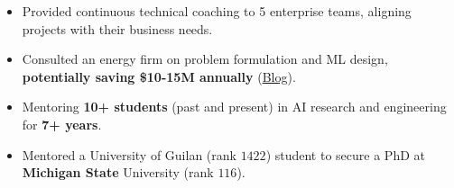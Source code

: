 {
}

    
\begin{itemize}
    \item Provided continuous technical coaching to 5 enterprise teams, aligning projects with their business needs.
    \item Consulted an energy firm on problem formulation and ML design, \textbf{potentially saving \$10-15M annually} (\href{https://www.amii.ca/latest-from-amii/venturi-uses-machine-learning-reduce-emissions-increase-safety-pipelines/}{Blog}).
\end{itemize}

\begin{itemize}
    \item Mentoring \textbf{10+ students} (past and present) in AI research and engineering for \textbf{7+ years}.
    \item Mentored a University of Guilan (rank $1422$) student to secure a PhD at \textbf{Michigan State} University (rank $116$).
\end{itemize}


